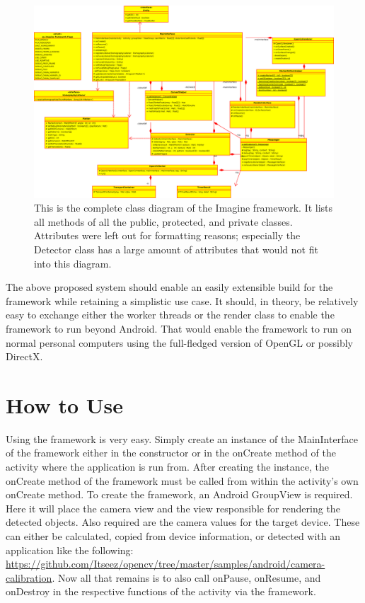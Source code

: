 \begin{figure}
	\centering
	\includegraphics[width=21cm]{img/complete_class_diagram.eps}
	\caption[Complete Class Diagram]{This is the complete class diagram of the Imagine framework. It lists all methods of all the public, protected, and private classes. Attributes were left out for formatting reasons; especially the Detector class has a large amount of attributes that would not fit into this diagram.}
	\label{fig:complete_class_diagram}
\end{figure}

The above proposed system should enable an easily extensible build for the framework while retaining a simplistic use case.
It should, in theory, be relatively easy to exchange either the worker threads or the render class to enable the framework to run beyond Android.
That would enable the framework to run on normal personal computers using the full-fledged version of OpenGL or possibly DirectX.

\section{How to Use}

Using the framework is very easy.
Simply create an instance of the MainInterface of the framework either in the constructor or in the onCreate method of the activity where the application is run from.
After creating the instance, the onCreate method of the framework must be called from within the activity's own onCreate method.
To create the framework, an Android GroupView is required.
Here it will place the camera view and the view responsible for rendering the detected objects. Also required are the camera values for the target device.
These can either be calculated, copied from device information, or detected with an application like the following: \url{https://github.com/Itseez/opencv/tree/master/samples/android/camera-calibration}.
Now all that remains is to also call onPause, onResume, and onDestroy in the respective functions of the activity via the framework.

